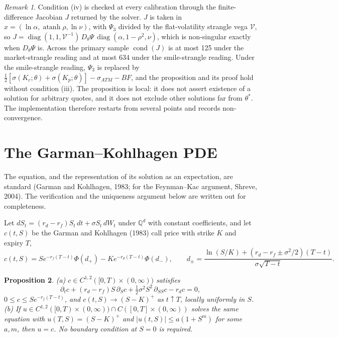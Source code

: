 \documentclass[11pt]{article}
\newtheorem{proposition}{Proposition}
\theoremstyle{remark}
\newtheorem{remark}[proposition]{Remark}
\newcommand{\Q}{\mathbb{Q}}
\begin{document}
\begin{remark}
Condition (iv) is checked at every calibration through the finite-difference Jacobian $J$ returned by the solver. $J$ is taken in $x=(\ln\alpha,\operatorname{atanh}\rho,\ln\nu)$, with $\Psi_3$ divided by the flat-volatility strangle vega $\mathcal V$, so $J=\operatorname{diag}(1,1,\mathcal V^{-1})\,D_\theta\Psi\,\operatorname{diag}(\alpha,1-\rho^2,\nu)$, which is non-singular exactly when $D_\theta\Psi$ is. Across the primary sample $\operatorname{cond}(J)$ is at most 125 under the market-strangle reading and at most 634 under the smile-strangle reading. Under the smile-strangle reading, $\Psi_3$ is replaced by $\tfrac12[\sigma(K_c;\theta)+\sigma(K_p;\theta)]-\sigma_{ATM}-BF$, and the proposition and its proof hold without condition (iii). The proposition is local: it does not assert existence of a solution for arbitrary quotes, and it does not exclude other solutions far from $\theta^*$. The implementation therefore restarts from several points and records non-convergence.
\end{remark}

\section*{The Garman--Kohlhagen PDE}

The equation, and the representation of its solution as an expectation, are standard (Garman and Kohlhagen, 1983; for the Feynman--Kac argument, Shreve, 2004). The verification and the uniqueness argument below are written out for completeness.

Let $dS_t=(r_d-r_f)S_t\,dt+\sigma S_t\,dW_t$ under $\Q^d$ with constant coefficients, and let $c(t,S)$ be the Garman and Kohlhagen (1983) call price with strike $K$ and expiry $T$,
\[
c(t,S)=Se^{-r_f(T-t)}\Phi(d_+)-Ke^{-r_d(T-t)}\Phi(d_-),\qquad d_\pm=\frac{\ln(S/K)+(r_d-r_f\pm\sigma^2/2)(T-t)}{\sigma\sqrt{T-t}}.
\]

\begin{proposition}
(a) $c\in C^{1,2}([0,T)\times(0,\infty))$ satisfies
\[
\partial_tc+(r_d-r_f)S\,\partial_Sc+\tfrac12\sigma^2S^2\,\partial_{SS}c-r_dc=0,
\]
$0\le c\le Se^{-r_f(T-t)}$, and $c(t,S)\to(S-K)^+$ as $t\uparrow T$, locally uniformly in $S$. (b) If $u\in C^{1,2}([0,T)\times(0,\infty))\cap C([0,T]\times(0,\infty))$ solves the same equation with $u(T,S)=(S-K)^+$ and $|u(t,S)|\le a(1+S^m)$ for some $a,m$, then $u=c$. No boundary condition at $S=0$ is required.
\end{proposition}
\end{document}
